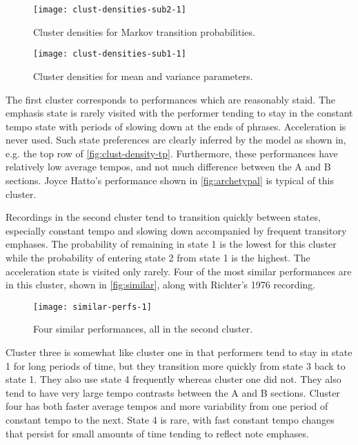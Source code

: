 \documentclass[12pt]{article}
\begin{document}
\begin{figure}[t]
  \centering
  \texttt{[image: clust-densities-sub2-1]}
  \caption{Cluster densities for Markov transition probabilities.}
  \label{fig:clust-density-tp}
\end{figure}
\begin{figure}[t]
  \centering
  \texttt{[image: clust-densities-sub1-1]}
  \caption{Cluster densities for mean and variance parameters.}
  \label{fig:clust-density-mv}
\end{figure}
The first cluster corresponds to performances which are reasonably
staid. The emphasis state is rarely visited with the performer tending
to stay in the constant tempo state with periods of slowing down at
the ends of phrases. Acceleration is never used. Such state
preferences are clearly inferred by the model as shown in, e.g. the
top row of \autoref{fig:clust-density-tp}. Furthermore, these
performances have relatively low average tempos, and not much
difference between the A and B sections. Joyce Hatto's performance
shown in \autoref{fig:archetypal} is typical of this cluster.

Recordings in the second
cluster tend to transition quickly between states, especially constant
tempo and slowing down accompanied by frequent transitory
emphases. The probability of remaining in state 1 is the lowest for
this cluster while the probability of entering state 2 from state 1 is
the highest. The acceleration state is visited only rarely. Four of
the most similar performances are in this cluster, shown in
\autoref{fig:similar}, along with Richter's 1976 recording.
\begin{figure}[t]
  \centering
  \texttt{[image: similar-perfs-1]}
  \caption{Four similar performances, all in the second cluster.}
  \label{fig:similar}
\end{figure}

Cluster three is somewhat like cluster one in that performers tend to
stay in state 1 for long periods of time, but they transition more
quickly from state 3 back to state 1. They also use state 4 frequently
whereas cluster one
did not. They also tend to have very large tempo
contrasts between the A and B sections.
Cluster four has both faster average tempos and more variability from one period of
constant tempo to the next. State 4 is rare, with fast constant tempo
changes that persist for small amounts of time tending to reflect note
emphases.
\end{document}
